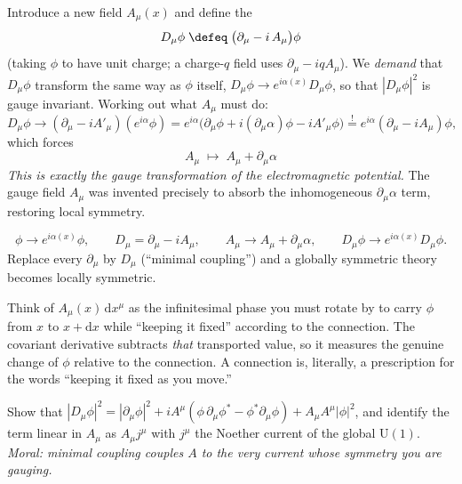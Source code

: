 \documentclass[11pt]{article}
\newcommand{\dd}{\mathrm{d}}                 %
\newcommand{\Uone}{\mathrm{U}(1)}
\begin{document}
Introduce a new field $A_\mu(x)$ and define the 
\[
D_\mu \phi \;\defeq\; \big(\partial_\mu - i\,A_\mu\big)\phi
\]
(taking $\phi$ to have unit charge; a charge-$q$ field uses $\partial_\mu - iq A_\mu$).
We \emph{demand} that $D_\mu\phi$ transform the same way as $\phi$ itself,
$D_\mu\phi \to e^{i\alpha(x)}D_\mu\phi$, so that $|D_\mu\phi|^2$ is gauge invariant.
Working out what $A_\mu$ must do:
\[
D_\mu\phi \to (\partial_\mu - iA'_\mu)(e^{i\alpha}\phi)
= e^{i\alpha}\big(\partial_\mu\phi + i(\partial_\mu\alpha)\phi - iA'_\mu\phi\big)
\stackrel{!}{=} e^{i\alpha}(\partial_\mu - iA_\mu)\phi,
\]
which forces
\[
\boxed{\;A_\mu \;\longmapsto\; A_\mu + \partial_\mu\alpha\;}
\]
\emph{This is exactly the gauge transformation of the electromagnetic potential.} The
gauge field $A_\mu$ was invented precisely to absorb the inhomogeneous
$\partial_\mu\alpha$ term, restoring local symmetry.

\begin{eequation}
\[
\phi \to e^{i\alpha(x)}\phi, \qquad
D_\mu = \partial_\mu - iA_\mu, \qquad
A_\mu \to A_\mu + \partial_\mu\alpha, \qquad
D_\mu\phi \to e^{i\alpha(x)} D_\mu\phi.
\]
Replace every $\partial_\mu$ by $D_\mu$ (``minimal coupling'') and a globally symmetric
theory becomes locally symmetric.
\end{eequation}

\begin{iintuition}
Think of $A_\mu(x)\,\dd x^\mu$ as the infinitesimal phase you must rotate by to carry
$\phi$ from $x$ to $x+\dd x$ while ``keeping it fixed'' according to the connection.
The covariant derivative subtracts \emph{that} transported value, so it measures the
genuine change of $\phi$ relative to the connection. A connection is, literally, a
prescription for the words ``keeping it fixed as you move.''
\end{iintuition}

\begin{xca}
Show that $|D_\mu\phi|^2 = |\partial_\mu\phi|^2 + iA^\mu(\phi\,\partial_\mu\phi^*
- \phi^*\partial_\mu\phi) + A_\mu A^\mu |\phi|^2$, and identify the term linear in
$A_\mu$ as $A_\mu j^\mu$ with $j^\mu$ the Noether current of the global $\Uone$.
\emph{Moral: minimal coupling couples $A$ to the very current whose symmetry you are
gauging.}
\end{xca}

\end{document}
